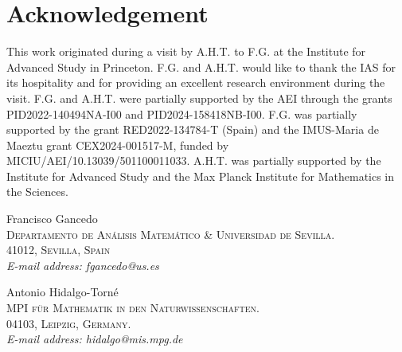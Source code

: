 \documentclass[11pt,a4paper]{article}
\begin{document}
\section*{Acknowledgement}
This work originated during a visit by A.H.T. to F.G. at the Institute for Advanced Study in Princeton. F.G. and A.H.T. would like to thank the IAS for its hospitality and for providing an excellent research environment during the visit. F.G. and A.H.T. were partially supported by the AEI through the grants PID2022-140494NA-I00 and PID2024-158418NB-I00. F.G. was partially supported by the grant RED2022-134784-T (Spain) and the IMUS-Maria de Maeztu grant CEX2024-001517-M, funded by MICIU/AEI/10.13039/501100011033. A.H.T. was partially supported by the Institute for Advanced Study and the Max Planck Institute for Mathematics in the Sciences.





\begin{flushleft}
	Francisco Gancedo\\
	\textsc{Departamento de An\'alisis Matem\'atico \& Universidad de Sevilla.\\
	41012, Sevilla, Spain}\\
	\textit{E-mail address:
    fgancedo@us.es}
\end{flushleft}

\begin{flushleft}
	Antonio Hidalgo-Torn\'e\\
	\textsc{MPI für Mathematik in den Naturwissenschaften. \\
    04103, Leipzig, Germany.}\\
	\textit{E-mail address: hidalgo@mis.mpg.de}
\end{flushleft}
\end{document}
